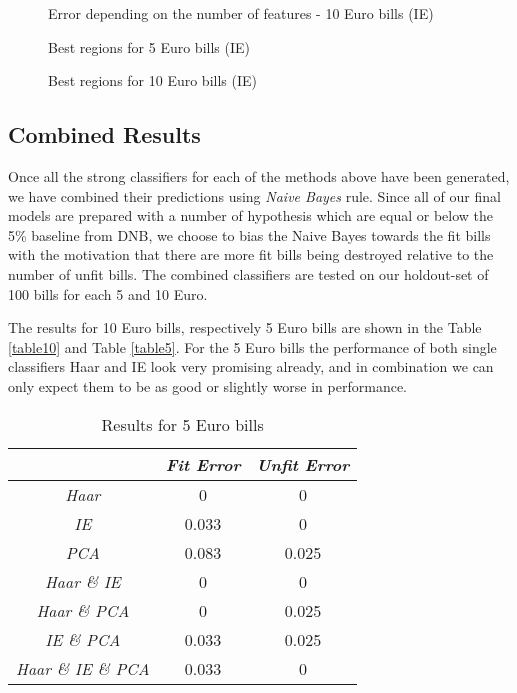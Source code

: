 \documentclass[11pt,twocolumn]{article}
\begin{document}
		\begin{figure}[!hbtp]
			\centering
			\caption{Error depending on the number of features - 10 Euro bills (IE)}
			\label{IE_plot10}
		\end{figure} 
		
		\begin{figure}[!hbtp]
			\centering
			\caption{Best regions for 5 Euro bills (IE)}
			\label{ie_regions5}
		\end{figure}
		
		\begin{figure}[!hbtp]
			\centering
			\caption{Best regions for 10 Euro bills (IE)}
			\label{ie_regions10}
		\end{figure}
		
					
		\subsection{Combined Results}\label{sec:comb_results}
			Once all the strong classifiers for each of the methods above have been generated, we have combined their predictions using \emph{Naive Bayes} rule. Since all of our final models are prepared with a number of hypothesis which are equal or below the 5\% baseline from DNB, we choose to bias the Naive Bayes towards the fit bills with the motivation that there are more fit bills being destroyed relative to the number of unfit bills. The combined classifiers are tested on our holdout-set of 100 bills for each 5 and 10 Euro.

			The results for 10 Euro bills, respectively 5 Euro bills are shown in the Table \ref{table10} and Table \ref{table5}. For the 5 Euro bills the performance of both single classifiers Haar and IE look very promising already, and in combination we can only expect them to be as good or slightly worse in performance.

			\begin{table}[!htbp]
				\caption{Results for 5 Euro bills}
				\selectfont\small
				\label{table5}
				\centering 
				\begin{tabular}{ | c | c | c|}
					\hline\hline & \emph{Fit Error} & \emph{Unfit Error} \\ [0.5ex]\hline 
					\emph{Haar} & 0 & 0 \\ [0.5ex]\hline
					\emph{IE} & 0.033 & 0 \\ [0.5ex]\hline
					\emph{PCA} & 0.083 & 0.025 \\ [0.5ex]\hline
					\emph{Haar \& IE} & 0 & 0 \\ [0.5ex]\hline
					\emph{Haar \& PCA} & 0 & 0.025 \\ [0.5ex]\hline
					\emph{IE \& PCA} & 0.033 & 0.025 \\ [0.5ex]\hline
					\emph{Haar \& IE \& PCA} & 0.033 & 0 \\ [0.5ex]\hline
				\end{tabular}
				\label{table:nonlin5eur} 
			\end{table}
\end{document}
